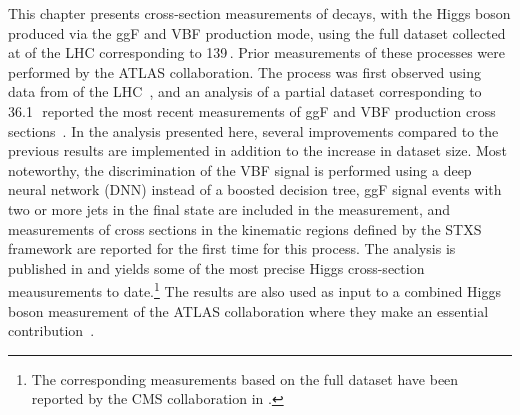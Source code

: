 This chapter presents cross-section measurements of \HWWdet decays, with the Higgs boson produced via the ggF and VBF production mode, using the full dataset collected at \RunTwo of the LHC corresponding to 139\,\ifb. 
Prior measurements of these processes were performed by the ATLAS collaboration. 
The \HWW process was first observed using data from \RunOne of the LHC~\cite{HIGG-2013-13}, and an analysis of a partial \RunTwo dataset corresponding to 36.1\,\ifb\ reported the most recent measurements of ggF and VBF production cross sections~\cite{HIGG-2013-13}.
In the analysis presented here, several improvements compared to the previous \RunTwo results are implemented in addition to the increase in dataset size. Most noteworthy, the discrimination of the VBF signal is performed using a deep neural network (DNN) instead of a boosted decision tree, ggF signal events with two or more jets in the final state are included in the measurement, and measurements of cross sections in the kinematic regions defined by the STXS framework are reported for the first time for this process.
The analysis is published in  and yields some of the most precise Higgs cross-section meausurements to date.\footnote{The corresponding measurements based on the full \RunTwo dataset have been reported by the CMS collaboration in .}
The results are also used as input to a combined Higgs boson measurement of the ATLAS collaboration where they make an essential contribution~\cite{NaturePaper}.

